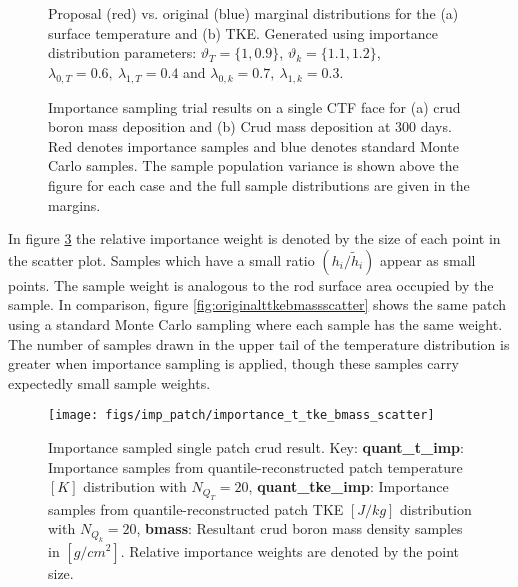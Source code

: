 \begin{figure}[H]%
    \centering
    \qquad
    \caption[]{Proposal (red) vs. original (blue) marginal distributions for the (a) surface temperature and (b) TKE.  Generated using importance distribution parameters: $\vartheta_T = \{1, 0.9\}$,  $\vartheta_k = \{1.1, 1.2\}$,  $\lambda_{0,T}=0.6,\ \lambda_{1,T}=0.4$ and $\lambda_{0,k}=0.7,\ \lambda_{1,k}=0.3$.}%
    \label{fig:imp_sample2}%
\end{figure}


\begin{figure}[H]%
    \centering
    \qquad
    \caption[]{Importance sampling trial results on a single CTF face for (a) crud boron mass deposition and (b) Crud mass deposition at 300 days.  Red denotes importance samples and blue denotes standard Monte Carlo samples.  The sample population variance is shown above the figure for each case and the full sample distributions are given in the margins.}%
    \label{fig:imp_sample1}%
\end{figure}

In figure \ref{fig:importancettkebmassscatter} the relative importance weight is denoted by the size of each point in the scatter plot.  Samples which have a small ratio $(h_i/\tilde h_i)$ appear as small points.  The sample weight is analogous to the rod surface area occupied by the sample.  In comparison, figure \ref{fig:originalttkebmassscatter} shows the same patch using a standard Monte Carlo sampling where each sample has the same weight.  The number of samples drawn in the upper tail of the temperature distribution is greater when importance sampling is applied, though these samples carry expectedly small sample weights.

\begin{figure}[H]
    \centering
    \texttt{[image: figs/imp\_patch/importance\_t\_tke\_bmass\_scatter]}
    \caption[Importance sampled single patch crud result.]{Importance sampled single patch crud result. Key: \textbf{quant\_t\_imp}: Importance samples from quantile-reconstructed patch temperature $[K]$ distribution with $N_{Q_T}=20$,  \textbf{quant\_tke\_imp}: Importance samples from quantile-reconstructed patch TKE $[J/kg]$ distribution with $N_{Q_k}=20$,  \textbf{bmass}:  Resultant crud boron mass density samples in $[g/cm^2]$. Relative importance weights are denoted by the point size.}
    \label{fig:importancettkebmassscatter}
\end{figure}

